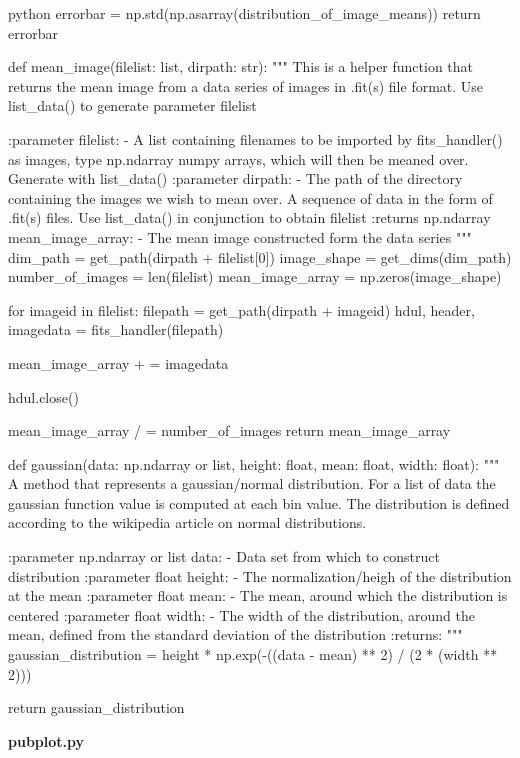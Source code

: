 \documentclass[../main.tex]{subfiles}
\begin{document}
\begin{mintedbox}{python}
errorbar  =  np.std(np.asarray(distribution_of_image_means))
return errorbar


def mean_image(filelist: list, dirpath: str):
"""
This is a helper function that returns the mean image from
a data series of images in .fit(s) file format. Use list_data()
to generate parameter filelist

:parameter filelist:
- A list containing filenames to be imported by
fits_handler() as images, type np.ndarray numpy arrays,
which will then be meaned over. Generate with list_data()
:parameter dirpath:
- The path of the directory containing the images we wish
to mean over. A sequence of data in the form of .fit(s)
files. Use list_data() in conjunction to obtain filelist
:returns np.ndarray mean_image_array:
- The mean image constructed form the data series
"""
dim_path             =    get_path(dirpath + filelist[0])
image_shape          =    get_dims(dim_path)
number_of_images     =    len(filelist)
mean_image_array     =    np.zeros(image_shape)

for imageid in filelist:
filepath                     =    get_path(dirpath + imageid)
hdul, header, imagedata      =    fits_handler(filepath)

mean_image_array + =  imagedata

hdul.close()

mean_image_array / =  number_of_images
return mean_image_array


def gaussian(data: np.ndarray or list, height: float, mean: float, width: float):
"""
A method that represents a gaussian/normal distribution. For a list
of data the gaussian function value is computed at each bin value.
The distribution is defined according to the wikipedia article on
normal distributions.

:parameter np.ndarray or list data:
- Data set from which to construct distribution
:parameter float height:
- The normalization/heigh of the distribution at the mean
:parameter float mean:
- The mean, around which the distribution is centered
:parameter float width:
- The width of the distribution, around the mean, defined
from the standard deviation of the distribution
:returns:
"""
gaussian_distribution    =    height * np.exp(-((data - mean) ** 2) / (2 * (width ** 2)))

return gaussian_distribution
\end{mintedbox}
\clearpage
\textbf{pubplot.py}
\end{document}
